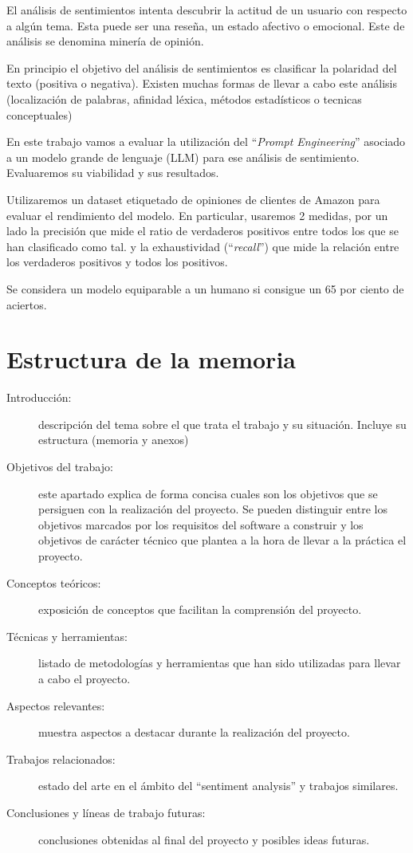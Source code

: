 
El análisis de sentimientos intenta descubrir la actitud de un usuario 
con respecto a algún tema.
Esta puede ser una reseña, un estado afectivo o emocional. 
Este de análisis se denomina minería de opinión.

En principio el objetivo del análisis de sentimientos es 
clasificar la polaridad del texto (positiva o negativa).
Existen muchas formas de llevar a cabo este análisis (localización de palabras, 
afinidad léxica, métodos estadísticos o tecnicas conceptuales)~\cite{Bannister2015}

En este trabajo vamos a evaluar la utilización del ``\emph{Prompt Engineering}'' 
asociado a un modelo grande de lenguaje (LLM) para ese análisis de sentimiento.
Evaluaremos su viabilidad y sus resultados. 

Utilizaremos un dataset etiquetado de opiniones de clientes de Amazon para evaluar 
el rendimiento del modelo. En particular, usaremos 2 medidas, por un lado la precisión 
que mide el ratio de verdaderos positivos entre todos los que se han clasificado como tal.
y la exhaustividad (``\emph{recall}'') que mide la relación entre los verdaderos positivos y 
todos los positivos.

Se considera un modelo equiparable a un humano si consigue un 65 por ciento de aciertos.~\cite[p.~4]{Saif2013}
\newpage
\section{Estructura de la memoria}
\begin{description}
	\item[Introducción:] descripción del tema sobre el que trata el trabajo y su situación. 
    Incluye su estructura (memoria y anexos)
	\item[Objetivos del trabajo:] este apartado explica de forma concisa cuales son los objetivos 
    que se persiguen con la realización del proyecto. 
    Se pueden distinguir entre los objetivos marcados por los requisitos del software a construir y
     los objetivos de carácter técnico que plantea a la hora de llevar a la práctica el proyecto.
    \item[Conceptos teóricos:] exposición de conceptos que facilitan la comprensión del proyecto.
    \item[Técnicas y herramientas:] listado de metodologías y herramientas que han sido 
    utilizadas para llevar a cabo el proyecto.
    \item[Aspectos relevantes:] muestra aspectos a destacar durante la realización del proyecto.
    \item[Trabajos relacionados:] estado del arte en el ámbito del ``sentiment analysis'' y trabajos similares.
    \item[Conclusiones y líneas de trabajo futuras:] conclusiones obtenidas al final del proyecto y posibles ideas futuras.
\end{description}
